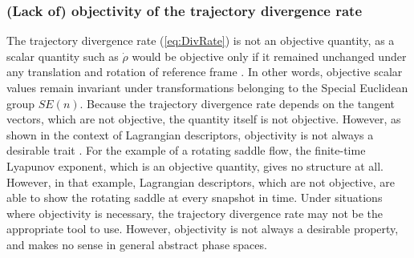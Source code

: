 \documentclass[twocolumn]{svjour3}
\begin{document}
\subsubsection{(Lack of) objectivity of the trajectory divergence rate}
The trajectory divergence rate (\ref{eq:DivRate}) is not an objective quantity, as a scalar quantity such as $\dot{\rho}$ would be objective only if it remained unchanged under any translation and rotation of reference frame \cite{truesdell2004non,serra_objective_2016}. In other words, objective scalar values remain invariant under transformations belonging to the Special Euclidean group $SE(n)$. Because the trajectory divergence rate depends on the tangent vectors, which are not objective, the quantity itself is not objective. However, as shown in the context of Lagrangian descriptors, objectivity is not always a desirable trait \cite{lopesino2017theoretical}. For the example of a rotating saddle flow, the finite-time Lyapunov exponent, which is an objective quantity, gives no structure at all. However, in that example, Lagrangian descriptors, which are not objective, are able to show the rotating saddle at every snapshot in time. Under situations where objectivity is necessary, the trajectory divergence rate may not be the appropriate tool to use. However, objectivity is not always a desirable property, and makes no sense in general abstract phase spaces.
\end{document}
